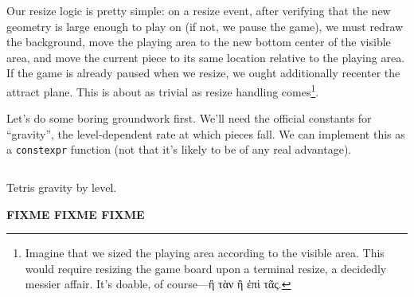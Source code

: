 Our resize logic is pretty simple: on a resize event, after verifying that the
new geometry is large enough to play on (if not, we pause the game), we must
redraw the background, move the playing area to the new bottom center of the
visible area, and move the current piece to its same location relative to the
playing area. If the game is already paused when we resize, we ought
additionally recenter the attract plane. This is about as trivial as resize
handling comes\footnote{Imagine that we sized the playing area according to the
visible area. This would require resizing the game board upon a terminal
resize, a decidedly messier affair. It's doable, of course---\textgreek{ἢ τὰν ἢ ἐπὶ τᾶς}.}.

Let's do some boring groundwork first. We'll need the official constants for
``gravity'', the level-dependent rate at which pieces fall. We can implement
this as a \texttt{constexpr} function (not that it's likely to be of any real
advantage).

\begin{listing}[!htb]
\inputminted[]{C}{code-tetris/gravity.h}
\caption{Tetris gravity by level.}
\label{list:tetris-gravity}
\end{listing}

\textbf{FIXME FIXME FIXME}
